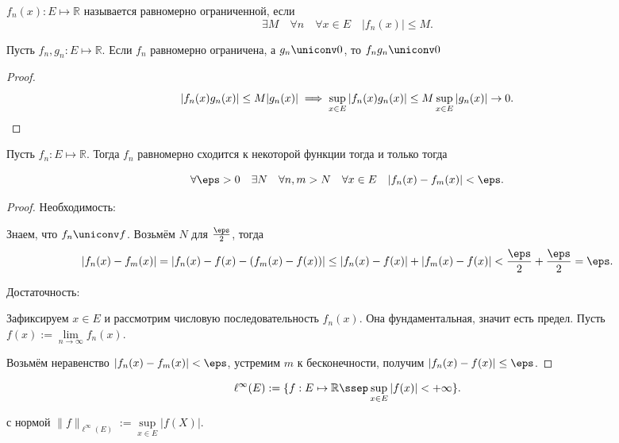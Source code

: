 \begin{definition} \thmslashn 

    $f_{n}(x) : E \mapsto \mathbb{R}$ называется равномерно ограниченной, если
    \[ \exists{M}\quad \forall{n}\quad \forall{x\in E}\quad |f_{n}(x)| \le M .\] 
\end{definition}
\begin{theorem} \thmslashn

    Пусть $f_{n}, g_{n} : E \mapsto \mathbb{R}$. Если $f_{n}$ равномерно ограничена, а $g_{n} \uniconv 0$, то $f_{n}g_{n} \uniconv 0$

    \begin{proof} \thmslashn
    
        \[ |f_{n}(x)g_{n}(x)| \le M|g_{n}(x)| \implies \sup\limits_{x\in E} |f_{n}(x)g_n(x)| \le M\sup\limits_{x\in E} |g_{n}(x)| \to 0 .\qedhere\]  
    \end{proof}
\end{theorem}
\begin{theorem} \thmslashn

    Пусть $f_{n} : E \mapsto \mathbb{R}$. Тогда $f_{n}$ равномерно сходится к некоторой функции тогда и только тогда

    \[ \forall{\eps > 0}\quad \exists{N}\quad \forall{n, m > N}\quad \forall{x\in E}\quad |f_{n}(x) - f_{m}(x)| < \eps .\] 
    \begin{proof} \thmslashn
    
        Необходимость:
        
        Знаем, что $f_{n} \uniconv f$. Возьмём $N$ для $\frac{\eps}{2}$, тогда
        \[ |f_{n}(x) - f_{m}(x)| = |f_{n}(x) - f(x) - (f_{m}(x) - f(x))| \le |f_{n}(x) - f(x)| + |f_{m}(x) - f(x)| < \frac{\eps}{2} + \frac{\eps}{2} = \eps .\]

        Достаточность:

        Зафиксируем $x\in E$ и рассмотрим числовую последовательность $f_{n}(x)$. Она фундаментальная, значит есть предел. Пусть $f(x) := \lim\limits_{n \to \infty} f_{n}(x)$.

        Возьмём неравенство $|f_{n}(x) - f_{m}(x)| < \eps$, устремим $m$ к бесконечности, получим $|f_{n}(x) - f(x)| \le \eps$.
    \end{proof}
\end{theorem}
\begin{definition} \thmslashn 

    \[ \ell^{\infty}(E) := \{f : E \mapsto \mathbb{R} \ssep \sup\limits_{x\in E}|f(x)| < +\infty\}  .\]

    с нормой $\|f\|_{\ell^{\infty}(E)} := \sup\limits_{x\in E} |f(X)|$.
\end{definition}
